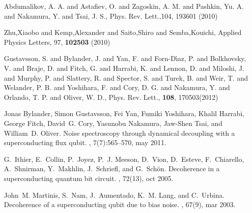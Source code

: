 \begin{thebibliography}{99}
 {Abdumalikov,  A.  A.  and Astafiev,  O.  and Zagoskin, A.   M.  and
    Pashkin, Yu.  A.  and  Nakamura, Y.  and Tsai, J.  S.},  {Phys.  Rev. Lett.},104, {193601}
  (2010)

  Zhu,Xiaobo and  Kemp,Alexander and  Saito,Shiro and  Semba,Kouichi, Applied
  Physics Letters, 97, \textbf{102503} (2010)




 {Gustavsson, S.   and Bylander, J.  and Yan,  F.  and Forn-D\'{\i}az,
    P.  and Bolkhovsky, V.  and Braje, D.  and  Fitch, G.  and Harrabi, K. and Lennon, D.  and
    Miloshi, J. and Murphy, P.  and Slattery, R.  and Spector, S.  and Turek, B.  and Weir, T.
    and Welander, P. B.  and Yoshihara, F.  and Cory, D.  G. and Nakamura, Y.  and Orlando, T.
    P.  and Oliver, W. D.}, {Phys. Rev. Lett.}, \textbf{108}, 170503(2012)

 Jonas  Bylander, Simon  Gustavsson, Fei  Yan, Fumiki  Yoshihara, Khalil
  Harrabi,  George Fitch,  David~G. Cory,  Yasunobu  Nakamura, Jaw-Shen  Tsai, and  William~D.
  Oliver.  \newblock  Noise spectroscopy through  dynamical decoupling with  a superconducting
  flux qubit.  , 7(7):565--570, may 2011.

  G.~Ithier,  E.~Collin,  P.~Joyez,  P.~J.   Meeson,  D.~Vion,  D.~Esteve,
  F.~Chiarello, A.~Shnirman, Y.~Makhlin, J.~Schriefl,  and G.~Schön.  \newblock Decoherence in
  a superconducting quantum bit circuit.  , 72(13), oct 2005.

  John~M. Martinis,  S.~Nam, J.~Aumentado,  K.~M.  Lang,  and C.~Urbina.
  \newblock Decoherence of a superconducting qubit due to bias noise.  , 67(9), mar 2003.
  

  

\end{thebibliography}
